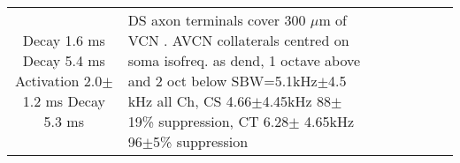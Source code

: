 \begin{longtable}{cYYYYYYY}

Decay 1.6 ms \citep[mouse VCN,]{Oertel:1983}
Decay 5.4 ms \citep{OertelWickesberg:1993,WickesbergOertel:1993}    
Activation 2.0$\pm$1.2 ms Decay 5.3 ms \citep[Gly puffs at 22$^\circ$C (Q$_{10}$ 2.1) in  guinea pig VCN,][]{HartyManis:1998}
                                & %
DS axon terminals cover 300 $\mu$m of VCN \citep[mouse][]{OertelWuEtAl:1990}.
AVCN collaterals centred on soma isofreq. as dend, 1 octave above and 2 oct below \citep[gerbil][]{ArnottWallaceEtAl:2004} 
SBW=5.1kHz$\pm$4.5 kHz all Ch, CS 4.66$\pm$4.45kHz 88$\pm$19\% suppression, CT 6.28$\pm$ 4.65kHz    96$\pm$5\% suppression \citep{RhodeGreenberg:1994b}
                                & %


\end{longtable}

